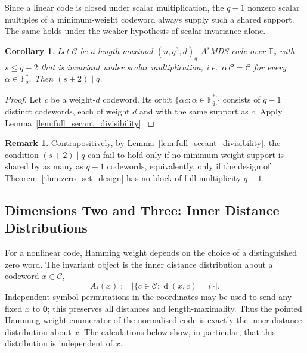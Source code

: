 \documentclass[12pt, letterpaper]{article}
\theoremstyle{plain}
\newtheorem{corollary}[theorem]{Corollary}
\theoremstyle{definition}
\newtheorem{remark}[theorem]{Remark}
\newcommand{\dist}{\operatorname{d}}
\begin{document}
	Since a linear code is closed under scalar multiplication, the $q-1$ nonzero scalar multiples of a minimum-weight codeword always supply such a shared support. The same holds under the weaker hypothesis of scalar-invariance alone.

	\begin{corollary}\label{cor:homogeneous_divisibility}
		Let $\mathcal{C}$ be a length-maximal $(n, q^3, d)_q$ $A^s$MDS code over $\mathbb{F}_q$ with $s \le q-2$ that is invariant under scalar multiplication, i.e.\ $\alpha\,\mathcal{C} = \mathcal{C}$ for every $\alpha \in \mathbb{F}_q^{\ast}$. Then $(s+2) \mid q$.
	\end{corollary}

	\begin{proof}
		Let $c$ be a weight-$d$ codeword. Its orbit $\{\alpha c : \alpha \in \mathbb{F}_q^{\ast}\}$ consists of $q-1$ distinct codewords, each of weight $d$ and with the same support as $c$. Apply Lemma~\ref{lem:full_secant_divisibility}.
	\end{proof}

	\begin{remark}
		Contrapositively, by Lemma~\ref{lem:full_secant_divisibility}, the condition $(s+2)\mid q$ can fail to hold only if no minimum-weight support is shared by as many as $q-1$ codewords, equivalently, only if the design of Theorem~\ref{thm:zero_set_design} has no block of full multiplicity $q-1$.
	\end{remark}

	\subsection{Dimensions Two and Three: Inner Distance Distributions}
	\label{sec:dim23}

	For a nonlinear code, Hamming weight depends on the choice of a distinguished zero word. The invariant object is the inner distance distribution about a codeword $x\in\mathcal C$,
	\[
	A_i(x):=\bigl|\{c\in\mathcal C:\dist(x,c)=i\}\bigr|.
	\]
	Independent symbol permutations in the coordinates may be used to send any fixed $x$ to $\mathbf0$; this preserves all distances and length-maximality. Thus the pointed Hamming weight enumerator of the normalised code is exactly the inner distance distribution about $x$. The calculations below show, in particular, that this distribution is independent of $x$. 
\end{document}
